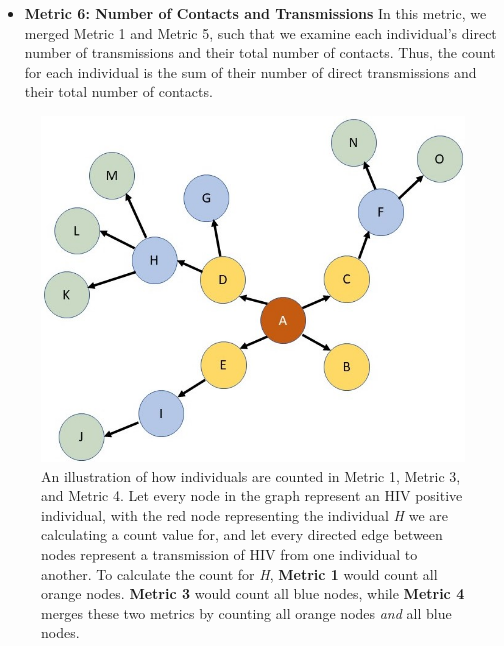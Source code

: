 \documentclass[twocolumn]{bmcart}%
\begin{document}
\begin{multicols}
\begin{itemize}
\item \textbf{Metric 6: Number of Contacts and Transmissions} In this metric, we merged Metric 1 and Metric 5, such that we examine each individual's direct number of transmissions and their total number of contacts. Thus, the count for each individual is the sum of their number of direct transmissions and their total number of contacts.\newline\newline

\end{itemize}

\begin{figure}[h!]
\centering
\includegraphics[scale=0.67]{Figures/transmission network.jpg}
\caption{An illustration of how individuals are counted in Metric 1, Metric 3, and Metric 4.
Let every node in the graph represent an HIV positive individual, with the red node representing the individual \textit{H} we are calculating a count value for, and let every directed edge between nodes represent a transmission of HIV from one individual to another.
To calculate the count for \textit{H}, \textbf{Metric 1} would count all orange nodes.
\textbf{Metric 3} would count all blue nodes, while \textbf{Metric 4} merges these two metrics by counting all orange nodes \textit{and} all blue nodes.} 
\end{figure}




\end{multicols}
\end{document}
